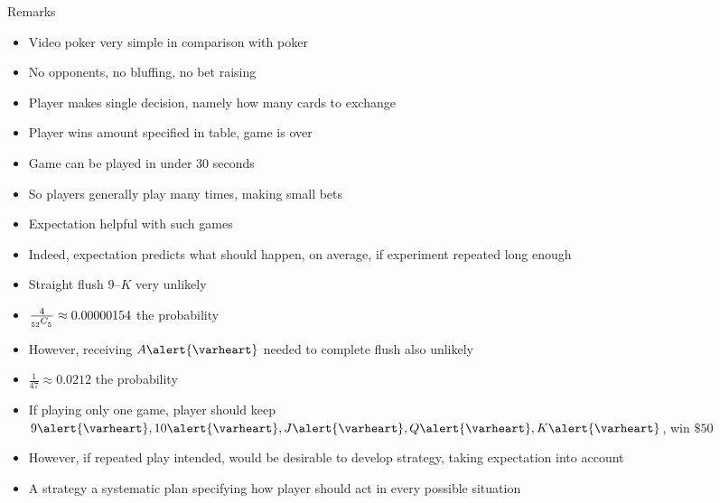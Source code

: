 \documentclass[xcolor=dvipsnames]{beamer}
\theoremstyle{definition}
\newcommand\ncr[2]{\tensor[_{#1}]C{_{#2}}}
\newcommand{\hs}{\alert{\varheart}}
\begin{document}
\begin{frame}{Remarks}
\begin{itemize}
\item Video poker very simple in comparison with poker
\item No opponents, no bluffing, no bet raising 
\item Player makes single decision, namely how many
cards to exchange
\item Player wins amount specified in table, game is over
\item Game can be played in under 30 seconds
\item So players generally play many times, making small bets
\item Expectation helpful with such games
\item Indeed, expectation predicts what should
happen, on average, if 
experiment repeated long enough
\end{itemize}
\end{frame}

\begin{frame}
\begin{itemize}
\item Straight flush $9$--$K$ very unlikely
\item $\frac{4}{\ncr{52}{5}}\approx 0.00000154$ the probability
\item However, receiving $A\hs$ needed to complete flush
also unlikely
\item $\frac{1}{47}\approx 0.0212$ the probability
\item If playing only one game, player should
keep $9\hs,10\hs,J\hs,Q\hs,K\hs$, win $\$50$
\item However, if repeated play intended, would
be desirable to develop \alert{strategy}, taking
expectation into account
\item A \alert{strategy} a systematic plan specifying 
how player should act in every possible situation
\end{itemize}
\end{frame}
\end{document}
